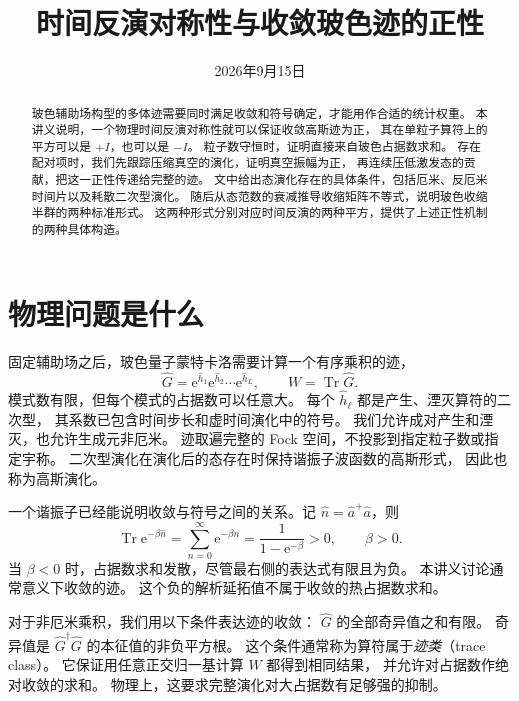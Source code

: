 \documentclass[UTF8,11pt,a4paper,fontset=fandol]{ctexart}
\title{时间反演对称性与收敛玻色迹的正性}
\author{}
\date{2026年9月15日}
\newcommand{\Tr}{\operatorname{Tr}}
\newcommand{\ee}{\mathrm e}
\numberwithin{equation}{section}
\begin{document}
\maketitle
\vspace{-1.5em}
\begin{abstract}
玻色辅助场构型的多体迹需要同时满足收敛和符号确定，才能用作合适的统计权重。
本讲义说明，一个物理时间反演对称性就可以保证收敛高斯迹为正，
其在单粒子算符上的平方可以是 $+I$，也可以是 $-I$。
粒子数守恒时，证明直接来自玻色占据数求和。
存在配对项时，我们先跟踪压缩真空的演化，证明真空振幅为正，
再连续压低激发态的贡献，把这一正性传递给完整的迹。
文中给出态演化存在的具体条件，包括厄米、反厄米时间片以及耗散二次型演化。
随后从态范数的衰减推导收缩矩阵不等式，说明玻色收缩半群的两种标准形式。
这两种形式分别对应时间反演的两种平方，提供了上述正性机制的两种具体构造。
\end{abstract}

\section{物理问题是什么}

固定辅助场之后，玻色量子蒙特卡洛需要计算一个有序乘积的迹，
\begin{equation}
 \hat G=\ee^{\hat h_1}\ee^{\hat h_2}\cdots\ee^{\hat h_L},
 \qquad W=\Tr\hat G.
 \label{eq:weight}
\end{equation}
模式数有限，但每个模式的占据数可以任意大。
每个 $\hat h_\ell$ 都是产生、湮灭算符的二次型，
其系数已包含时间步长和虚时间演化中的符号。
我们允许成对产生和湮灭，也允许生成元非厄米。
迹取遍完整的 Fock 空间，不投影到指定粒子数或指定宇称。
二次型演化在演化后的态存在时保持谐振子波函数的高斯形式，
因此也称为高斯演化。

一个谐振子已经能说明收敛与符号之间的关系。记 $\hat n=\hat a^+\hat a$，则
\begin{equation}
 \Tr\ee^{-\beta\hat n}
 =\sum_{n=0}^{\infty}\ee^{-\beta n}
 =\frac{1}{1-\ee^{-\beta}}>0,\qquad \beta>0.
 \label{eq:thermal_number}
\end{equation}
当 $\beta<0$ 时，占据数求和发散，尽管最右侧的表达式有限且为负。
本讲义讨论通常意义下收敛的迹。
这个负的解析延拓值不属于收敛的热占据数求和。

对于非厄米乘积，我们用以下条件表达迹的收敛：
$\hat G$ 的全部奇异值之和有限。
奇异值是 $\hat G^\dagger\hat G$ 的本征值的非负平方根。
这个条件通常称为算符属于\emph{迹类}（trace class）。
它保证用任意正交归一基计算 $W$ 都得到相同结果，
并允许对占据数作绝对收敛的求和。
物理上，这要求完整演化对大占据数有足够强的抑制。
\end{document}
